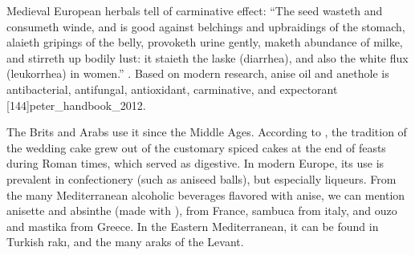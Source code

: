 Medieval European herbals tell of carminative effect: ``The seed wasteth and consumeth winde, and is good against belchings and upbraidings of the stomach, alaieth gripings of the belly, provoketh urine gently, maketh abundance of milke, and stirreth up bodily lust: it staieth the laske (diarrhea), and also the white flux (leukorrhea) in women.'' \autocite[880 ]{gerarde_herball_1597}. Based on modern research, anise oil and anethole is antibacterial, antifungal, antioxidant, carminative, and expectorant [144]{peter_handbook_2012}.

The Brits and Arabs use it since the Middle Ages. According to \textcite{wilson_wedding_2005}, 
the tradition of the wedding cake grew out of the customary spiced cakes at the end of feasts during Roman times, which served as digestive. In modern Europe, its use is prevalent in confectionery (such as aniseed balls), but especially liqueurs. From the many Mediterranean alcoholic beverages flavored with anise, we can mention anisette and absinthe (made with ), from France, sambuca from italy, and ouzo and mastika from Greece. 
In the Eastern Mediterranean, it can be found in Turkish rakı, and the many araks of the Levant.


